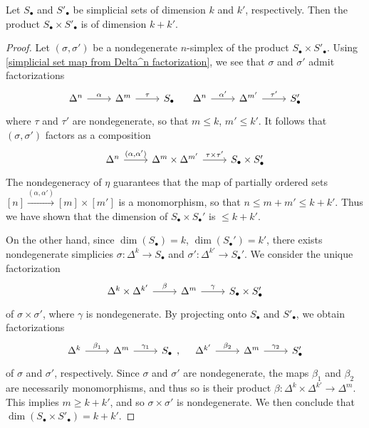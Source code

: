 \begin{proposition}\label{simplicial set dimension of product}
Let $S_\bullet$ and $S'_\bullet$ be simplicial sets of dimension $k$ and $k'$, respectively. Then the product $S_\bullet\times S'_\bullet$ is of dimension $k+k'$.
\end{proposition}
\begin{proof}
Let $(\sigma,\sigma')$ be a nondegenerate $n$-simplex of the product $S_\bullet\times S'_\bullet$. Using \cref{simplicial set map from Delta^n factorization}, we see that $\sigma$ and $\sigma'$ admit factorizations
\[\begin{tikzcd}
\Delta^n\ar[r,"\alpha"]&\Delta^{m}\ar[r,"\tau"]&S_\bullet
\end{tikzcd}\quad \begin{tikzcd}
\Delta^n\ar[r,"\alpha'"]&\Delta^{m'}\ar[r,"\tau'"]&S'_\bullet
\end{tikzcd}\]
where $\tau$ and $\tau'$ are nondegenerate, so that $m\leq k$, $m'\leq k'$. It follows that $(\sigma,\sigma')$ factors as a composition
\[\begin{tikzcd}
\Delta^n\ar[r,"{(\alpha,\alpha')}"]&\Delta^m\times\Delta^{m'}\ar[r,"{\tau\times\tau'}"]&S_\bullet\times S'_\bullet
\end{tikzcd}\]
The nondegeneracy of $\eta$ guarantees that the map of partially ordered sets $[n]\stackrel{(\alpha,\alpha')}{\to}[m]\times[m']$ is a monomorphism, so that $n\leq m+m'\leq k+k'$. Thus we have shown that the dimension of $S_\bullet\times S_\bullet'$ is $\leq k+k'$.\par
On the other hand, since $\dim(S_\bullet)=k$, $\dim(S_\bullet')=k'$, there exists nondegenerate simplicies $\sigma:\Delta^k\to S_\bullet$ and $\sigma':\Delta^{k'}\to S_\bullet'$. We consider the unique factorization
\[\begin{tikzcd}
\Delta^k\times\Delta^{k'}\ar[r,"\beta"]&\Delta^m\ar[r,"\gamma"]&S_\bullet\times S_\bullet'
\end{tikzcd}\]
of $\sigma\times\sigma'$, where $\gamma$ is nondegenerate. By projecting onto $S_\bullet$ and $S'_\bullet$, we obtain factorizations
\[\begin{tikzcd}
\Delta^k\ar[r,"\beta_1"]&\Delta^m\ar[r,"\gamma_1"]&S_\bullet
\end{tikzcd},\quad\begin{tikzcd}
\Delta^{k'}\ar[r,"\beta_2"]&\Delta^m\ar[r,"\gamma_2"]&S'_\bullet
\end{tikzcd}\]
of $\sigma$ and $\sigma'$, respectively. Since $\sigma$ and $\sigma'$ are nondegenerate, the maps $\beta_1$ and $\beta_2$ are necessarily monomorphisms, and thus so is their product $\beta:\Delta^k\times\Delta^{k'}\to\Delta^m$. This implies $m\geq k+k'$, and so $\sigma\times\sigma'$ is nondegenerate. We then conclude that $\dim(S_\bullet\times S'_\bullet)=k+k'$.
\end{proof}
